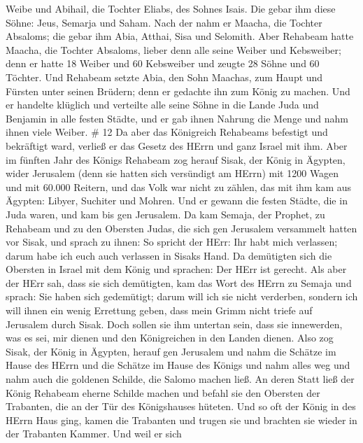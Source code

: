 Weibe und Abihail, die Tochter Eliabs, des Sohnes Isais. 
Die gebar ihm diese Söhne: Jeus, Semarja und Saham.  Nach
der nahm er Maacha, die Tochter Absaloms; die gebar ihm Abia, Atthai,
Sisa und Selomith.  Aber Rehabeam hatte Maacha, die Tochter
Absaloms, lieber denn alle seine Weiber und Kebsweiber; denn er hatte 18
Weiber und 60 Kebsweiber und zeugte 28 Söhne und 60 Töchter.
 Und Rehabeam setzte Abia, den Sohn Maachas, zum Haupt und
Fürsten unter seinen Brüdern; denn er gedachte ihn zum König zu machen.
 Und er handelte klüglich und verteilte alle seine Söhne in
die Lande Juda und Benjamin in alle festen Städte, und er gab ihnen
Nahrung die Menge und nahm ihnen viele Weiber. \# 12  Da
aber das Königreich Rehabeams befestigt und bekräftigt ward, verließ er
das Gesetz des HErrn und ganz Israel mit ihm.  Aber im
fünften Jahr des Königs Rehabeam zog herauf Sisak, der König in Ägypten,
wider Jerusalem (denn sie hatten sich versündigt am HErrn) 
mit 1200 Wagen und mit 60.000 Reitern, und das Volk war nicht zu zählen,
das mit ihm kam aus Ägypten: Libyer, Suchiter und Mohren. 
Und er gewann die festen Städte, die in Juda waren, und kam bis gen
Jerusalem.  Da kam Semaja, der Prophet, zu Rehabeam und zu
den Obersten Judas, die sich gen Jerusalem versammelt hatten vor Sisak,
und sprach zu ihnen: So spricht der HErr: Ihr habt mich verlassen; darum
habe ich euch auch verlassen in Sisaks Hand.  Da demütigten
sich die Obersten in Israel mit dem König und sprachen: Der HErr ist
gerecht.  Als aber der HErr sah, dass sie sich demütigten,
kam das Wort des HErrn zu Semaja und sprach: Sie haben sich gedemütigt;
darum will ich sie nicht verderben, sondern ich will ihnen ein wenig
Errettung geben, dass mein Grimm nicht triefe auf Jerusalem durch Sisak.
 Doch sollen sie ihm untertan sein, dass sie innewerden, was
es sei, mir dienen und den Königreichen in den Landen dienen.
 Also zog Sisak, der König in Ägypten, herauf gen Jerusalem
und nahm die Schätze im Hause des HErrn und die Schätze im Hause des
Königs und nahm alles weg und nahm auch die goldenen Schilde, die Salomo
machen ließ.  An deren Statt ließ der König Rehabeam eherne
Schilde machen und befahl sie den Obersten der Trabanten, die an der Tür
des Königshauses hüteten.  Und so oft der König in des
HErrn Haus ging, kamen die Trabanten und trugen sie und brachten sie
wieder in der Trabanten Kammer.  Und weil er sich
